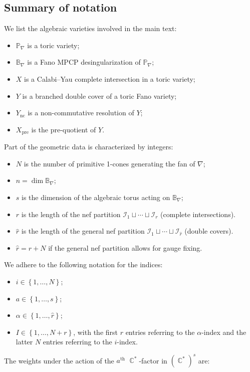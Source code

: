 \documentclass[12pt,a4paper,oneside]{amsart}
\numberwithin{equation}{section}
\theoremstyle{definition}
\theoremstyle{remark}
\DeclareMathOperator{\C}{\mathbb{C}}
\newcommand{\cP}{\mathbb{P}}
\newcommand{\cB}{\mathbb{B}}
\newcommand{\Ync}{Y_{\mathrm{nc}}}
\newcommand{\Xpre}{X_{\mathrm{pre}}}
\begin{document}
\begin{appendix}
\section{Summary of notation}
\label{app:Notation}
We list the algebraic varieties involved in the main text:
\begin{itemize}
	\item $\cP_{\nabla}$ is a toric variety;
    \item $\cB_{\nabla}$ is a Fano MPCP desingularization of $\cP_{\nabla}$;
	\item $X$ is a Calabi--Yau complete intersection in a toric variety;
	\item $Y$ is a branched double cover of a toric Fano variety;
	\item $\Ync$ is a non-commutative resolution of $Y$;
	\item $\Xpre$ is the pre-quotient of $Y$.
\end{itemize}
Part of the geometric data is characterized by integers:
\begin{itemize}
	\item $N$ is the number of primitive 1-cones generating the fan of $\nabla$;
	\item $n=\dim \cB_{\nabla}$;
	\item $s$ is the dimension of the algebraic torus acting on $\cB_{\nabla}$;
	\item $r$ is the length of the nef partition $\mathcal{I}_1 \sqcup \cdots \sqcup \mathcal{I}_r $ (complete intersections).
    \item $\hat{r}$ is the length of the general nef partition $\mathcal{I}_1 \sqcup \cdots \sqcup \mathcal{I}_{\hat{r}} $ (double covers).
    \item $\hat{r}=r+N$ if the general nef partition allows for gauge fixing.
\end{itemize}
We adhere to the following notation for the indices:
\begin{itemize}
	\item $i \in \left\{ 1, \dots, N\right\}$;
	\item $a \in \left\{ 1, \dots, s\right\}$;
	\item $\alpha \in \left\{ 1, \dots, \hat{r}\right\}$;
	\item $I \in \left\{1, \dots, N+r \right\}$, with the first $r$ entries referring to the $\alpha$-index and the latter $N$ entries referring to the $i$-index.
\end{itemize}
The weights under the action of the $a^{\text{th}}$ $\C^{\ast}$-factor in $(\C^{\ast})^s$ are:

\end{appendix}
\end{document}
